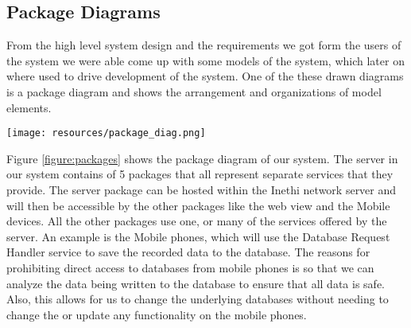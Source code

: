 \subsection{Package Diagrams}\label{subsec:package-diagrams}
From the high level system design and the requirements we got form the users of the system we were able come up with some models of the system, which later on where used to drive development of the system.
One of the these drawn diagrams is a package diagram and shows the arrangement and organizations of model elements.
\begin{figure*}
    \begin{center}
        \texttt{[image: resources/package\_diag.png]}
    \end{center}
    \caption{Showing UML package diagrams of the system.}
    \label{figure:packages}
\end{figure*}
Figure \ref{figure:packages} shows the package diagram of our system.
The server in our system contains of 5 packages that all represent separate services that they provide.
The server package can be hosted within the Inethi network server and will then be accessible by the other packages like the web view and the Mobile devices.
All the other packages use one, or many of the services offered by the server.
An example is the Mobile phones, which will use the Database Request Handler service to save the recorded data to the database.
The reasons for prohibiting direct access to databases from mobile phones is so that we can analyze the data being written to the database to ensure that all data is safe.
Also, this allows for us to change the underlying databases without needing to change the or update any functionality on the mobile phones.


